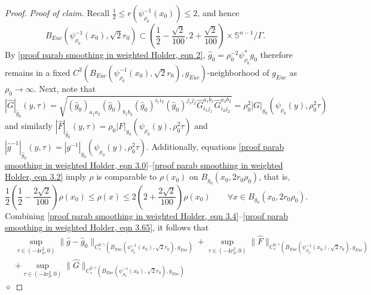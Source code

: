 \documentclass[12pt]{amsart}
\renewcommand{\1}{{\mathbf 1}}
\newenvironment{claimproof}{\par\noindent\textit{Proof of claim.}\space}{\hfill$\diamond$\medskip\par}
\theoremstyle{others}
\numberwithin{equation}{section}
\begin{document}
\begin{proof}
\begin{claimproof}
        Recall $\frac12 \le r ( \psi_{\rho_0}^{-1} (x_0) ) \le 2$, and hence
        \begin{equation} \label{proof parab smoothing in weighted Holder, eqn 3.5}
            B_{Euc} ( \psi_{\rho_0}^{-1} (x_0) , \sqrt 2 r_0) \subset \left( \frac12 - \frac{\sqrt 2}{100}, 2 + \frac{\sqrt 2}{100} \right) \times \mathbb S^{n-1} / \Gamma.
        \end{equation}
        By \eqref{proof parab smoothing in weighted Holder, eqn 2}, $\hat g_0 = \rho_0^{-2} \psi_{\rho_0}^* g_0$ therefore remains in a fixed $C^3(B_{Euc} ( \psi_{\rho_0}^{-1} (x_0) , \sqrt 2 r_0), g_{Euc})$-neighborhood of $g_{Euc}$ as $\rho_0 \to \infty$.
        Next, note that
        \begin{equation} \label{proof parab smoothing in weighted Holder, eqn 3.6}
            | \hat G |_{\hat g_0 } (y, \tau) = \sqrt{ (\hat g_0)_{a_1 a_2} (\hat g_0)_{b_1 b_2} (\hat g_0)^{i_1 i_2} (\hat g_0)^{j_1 j_2} \hat G_{i_1 j_1}^{a_1 b_1} \hat G_{i_2 j_2}^{a_2 b_2}  } = \rho_0^2 |G|_{g_0} ( \psi_{\rho_0}(y), \rho_0^2 \tau)  
        \end{equation}
        and similarly $|\hat F |_{\hat g_0}(y, \tau) = \rho_0 |F |_{g_0} ( \psi_{\rho_0}(y), \rho_0^2 \tau)$ and $|\hat g^{-1} |_{\hat g_0}(y, \tau) = |g^{-1}|_{g_0} ( \psi_{\rho_0}(y), \rho_0^2 \tau)$.
        Additionally, equations \eqref{proof parab smoothing in weighted Holder, eqn 3.0}--\eqref{proof parab smoothing in weighted Holder, eqn 3.2} imply $\rho$ is comparable to $\rho(x_0)$ on $ B_{g_0}(x_0, 2 r_0 \rho_0)$, that is,
        \begin{equation} \label{proof parab smoothing in weighted Holder, eqn 3.65}
            \frac12 \left( \frac12 - \frac{2 \sqrt 2}{100} \right) \rho(x_0) \le \rho(x) \le 2 \left( 2 + \frac{2 \sqrt 2}{100} \right) \rho(x_0) \qquad 
            \forall x \in B_{g_0}(x_0, 2 r_0 \rho_0).
        \end{equation}
        Combining \eqref{proof parab smoothing in weighted Holder, eqn 3.4}--\eqref{proof parab smoothing in weighted Holder, eqn 3.65},
        it follows that
        \begin{align*}
            & \sup_{\tau \in (-4r_0^2, 0)} \| \hat g - \hat g_0 \|_{C^{0, \gamma}_*( B_{Euc}( \psi_{\rho_0}^{-1}(x_0), \sqrt 2 r_0) ,  g_{Euc}) } + \sup_{\tau \in (-4r_0^2, 0)} \| \hat F \|_{C^{0, \gamma}_*( B_{Euc}( \psi_{\rho_0}^{-1}(x_0), \sqrt 2 r_0) ,  g_{Euc}) } \\
            &+ \sup_{\tau \in (-4r_0^2, 0)} \| \hat G \|_{C^{0, \gamma}_*( B_{Euc}( \psi_{\rho_0}^{-1}(x_0), \sqrt 2 r_0) ,  g_{Euc}) }

\end{align*}
\end{claimproof}
\end{proof}
\end{document}
